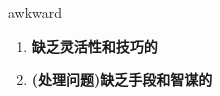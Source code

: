 
\begin{frame}
{\huge awkward}
\begin{center}
\begin{enumerate}\Large
  \item \textbf{缺乏灵活性和技巧的}
  \item \textbf{(处理问题)缺乏手段和智谋的}
\end{enumerate}
\end{center}
\end{frame}
